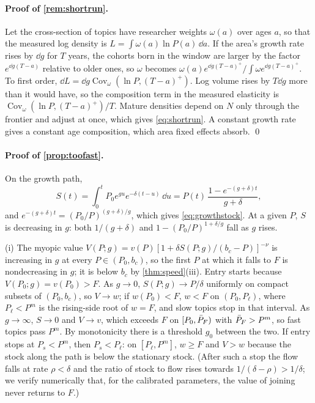 \paragraph{Proof of \cref{rem:shortrun}.} Let the cross-section of topics have
researcher weights $\omega(a)$ over ages $a$, so that the measured log density is
$L=\int\omega(a)\ln P(a)\,\dd a$. If the area's growth rate rises by $\dd g$ for
$T$ years, the cohorts born in the window are larger by the factor
$e^{\dd g(T-a)}$ relative to older ones, so $\omega$ becomes
$\omega(a)e^{\dd g(T-a)^+}/\int\omega e^{\dd g(T-a)^+}$. To first order,
$\dd L=\dd g\operatorname{Cov}_\omega(\ln P,(T-a)^+)$. Log volume rises by
$T\dd g$ more than it would have, so the composition term in the measured
elasticity is $\operatorname{Cov}_\omega(\ln P,(T-a)^+)/T$. Mature densities
depend on $N$ only through the frontier and adjust at once, which gives
\eqref{eq:shortrun}. A constant growth rate gives a constant age composition,
which area fixed effects absorb. \qed

\paragraph{Proof of \cref{prop:toofast}.} On the growth path,
\[
S(t)=\int_0^tP_0e^{gu}e^{-\delta(t-u)}\,\dd u=P(t)\,\frac{1-e^{-(g+\delta)t}}{g+\delta},
\]
and $e^{-(g+\delta)t}=(P_0/P)^{(g+\delta)/g}$, which gives \eqref{eq:growthstock}.
At a given $P$, $S$ is decreasing in $g$: both $1/(g+\delta)$ and
$1-(P_0/P)^{1+\delta/g}$ fall as $g$ rises.

(i) The myopic value $V(P;g)=v(P)[1+\delta S(P;g)/(b_c-P)]^{-\nu}$ is increasing in
$g$ at every $P\in(P_0,b_c)$, so the first $P$ at which it falls to $F$ is
nondecreasing in $g$; it is below $b_c$ by \cref{thm:speed}(iii). Entry starts
because $V(P_0;g)=v(P_0)>F$. As $g\to0$, $S(P;g)\to P/\delta$ uniformly on compact
subsets of $(P_0,b_c)$, so $V\to w$; if $w(P_0)<F$, $w<F$ on $(P_0,P_\ell)$, where
$P_\ell<P^m$ is the rising-side root of $w=F$, and slow topics stop in that
interval. As $g\to\infty$, $S\to0$ and $V\to v$, which exceeds $F$ on
$[P_0,\bar P_F)$ with $\bar P_F>P^m$, so fast topics pass $P^m$. By monotonicity
there is a threshold $g_0$ between the two. If entry stops at $P_s<P^m$, then
$P_s<P_\ell$: on $[P_\ell,P^m]$, $w\ge F$ and $V>w$ because the stock along the
path is below the stationary stock. (After such a stop the flow falls at rate
$\rho<\delta$ and the ratio of stock to flow rises towards
$1/(\delta-\rho)>1/\delta$; we verify numerically that, for the calibrated
parameters, the value of joining never returns to $F$.)

